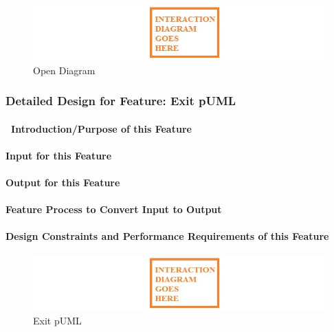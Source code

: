 \documentclass[twoside,letterpaper]{article}
\begin{document}
{{}
\bigskip

\begin{figure}[h]
\centering
\includegraphics[width=6.0in]{temp.jpg}
\caption{Open Diagram}
\end{figure}
\clearpage



% 
%

\subsubsection{Detailed Design for Feature: Exit pUML }
\paragraph[\ Introduction/Purpose of this Feature]
{\ Introduction/Purpose of this Feature}
{

}

\paragraph[Input for this Feature]{Input for this Feature}
{

}

\paragraph{Output for this Feature}
{

}

\paragraph{Feature Process to Convert Input to Output}
{

}

\paragraph{Design Constraints and Performance Requirements of this Feature}
{

}
\bigskip

\begin{figure}[h]
\centering
\includegraphics[width=6.0in]{temp.jpg}
\caption{Exit pUML}
\end{figure}
\clearpage



}
\end{document}
